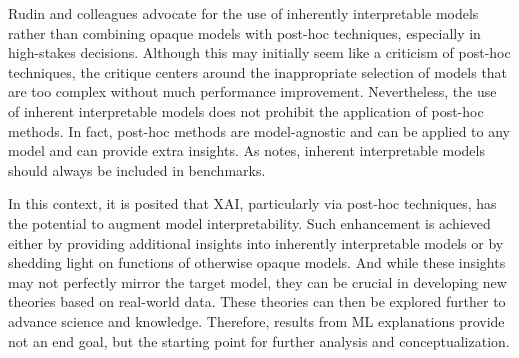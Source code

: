 Rudin and colleagues \cite{Rudin2019StopInstead} advocate for the use of inherently interpretable models rather than combining opaque models with post-hoc techniques, especially in high-stakes decisions. Although this may initially seem like a criticism of post-hoc techniques, the critique centers around the inappropriate selection of models that are too complex without much performance improvement. Nevertheless, the use of inherent interpretable models does not prohibit the application of post-hoc methods. In fact, post-hoc methods are model-agnostic and can be applied to any model and can provide extra insights. As \cite{Molnar2022Model-agnosticLearning} notes, inherent interpretable models should always be included in benchmarks. 

In this context, it is posited that XAI, particularly via post-hoc techniques, has the potential to augment model interpretability. Such enhancement is achieved either by providing additional insights into inherently interpretable models or by shedding light on functions of otherwise opaque models. And while these insights may not perfectly mirror the target model, they can be crucial in developing new theories based on real-world data. These theories can then be explored further to advance science and knowledge.
Therefore, results from ML explanations provide not an end goal, but the starting point for further analysis and conceptualization.









